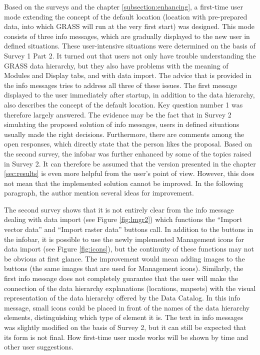 \documentclass[a4paper,10pt,twoside]{article}
\begin{document}
Based on the surveys and the chapter \ref{subsection:enhancing}, a
first-time user mode extending the concept of the default location
(location with pre-prepared data, into which GRASS will run at the
very first start) was designed. This mode consists of three info
messages, which are gradually displayed to the new user in defined
situations. These user-intensive situations were determined on the
basis of Survey 1 Part 2. It turned out that users not only have
trouble understanding the GRASS data hierarchy, but they also have
problems with the meaning of Modules and Display tabs, and with data
import. The advice that is provided in the info messages tries to
address all three of these issues. The first message displayed to the
user immediately after startup, in addition to the data hierarchy,
also describes the concept of the default location. Key question
number 1 was therefore largely answered. The evidence may be the fact
that in Survey 2 simulating the proposed solution of info messages,
users in defined situations usually made the right
decisions. Furthermore, there are comments among the open responses,
which directly state that the person likes the proposal. Based on the
second survey, the infobar was further enhanced by some of the topics
raised in Survey 2. It can therefore be assumed that the version
presented in the chapter \ref{sec:results} is even more helpful from
the user's point of view. However, this does not mean that the
implemented solution cannot be improved. In the following paragraph,
the author mention several ideas for improvement.

The second survey shows that it is not entirely clear from the info
message dealing with data import (see Figure \ref{fig:lmgr2}) which
functions the ``Import vector data'' and ``Import raster data''
buttons call. In addition to the buttons in the infobar, it is
possible to use the newly implemented Management icons for data import
(see Figure \ref{fig:icons}), but the continuity of these functions
may not be obvious at first glance. The improvement would mean adding
images to the buttons (the same images that are used for Management
icons). Similarly, the first info message does not completely
guarantee that the user will make the connection of the data hierarchy
explanations (locations, mapsets) with the visual representation of
the data hierarchy offered by the Data Catalog. In this info message,
small icons could be placed in front of the names of the data
hierarchy elements, distinguishing which type of element it is. The
text in info messages was slightly modified on the basis of Survey 2,
but it can still be expected that its form is not final. How
first-time user mode works will be shown by time and other user
suggestions.
\end{document}
